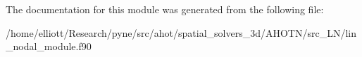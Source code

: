 The documentation for this module was generated from the following file\-:\begin{DoxyCompactItemize}
\item 
/home/elliott/\-Research/pyne/src/ahot/spatial\-\_\-solvers\-\_\-3d/\-A\-H\-O\-T\-N/src\-\_\-\-L\-N/lin\-\_\-nodal\-\_\-module.\-f90\end{DoxyCompactItemize}

